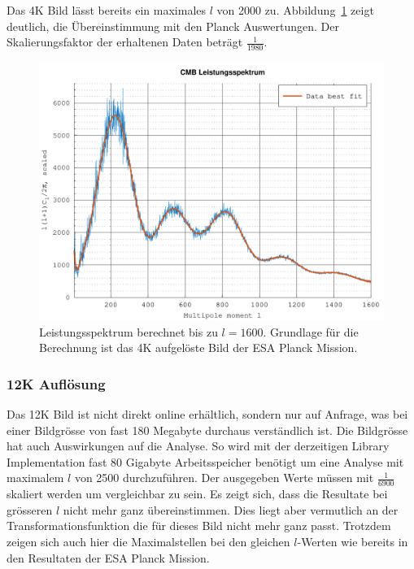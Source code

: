 Das 4K Bild lässt bereits ein maximales $l$ von 2000 zu. 
Abbildung~\ref{fig:cmb-power-spec-1600} zeigt deutlich, die Übereinstimmung mit 
den Planck Auswertungen. Der Skalierungsfaktor der erhaltenen Daten beträgt 
$\frac{1}{1980}$.

\begin{figure}
	\centering
	\includegraphics[width=\linewidth]{cmb/data/4k1800-500.pdf}
	\caption{Leistungsspektrum berechnet bis zu $l = 1600$. Grundlage für die 
		Berechnung ist das 4K aufgelöste Bild der ESA Planck Mission.}
	\label{fig:cmb-power-spec-1600}
\end{figure}

\subsubsection{12K Auflösung}

Das 12K Bild ist nicht direkt online erhältlich, sondern nur auf Anfrage, was 
bei einer Bildgrösse von fast 180 Megabyte durchaus verständlich ist. Die 
Bildgrösse hat auch Auswirkungen auf die Analyse. So wird mit der derzeitigen 
Library Implementation fast 80 Gigabyte Arbeitsspeicher benötigt um eine 
Analyse mit maximalem $l$ von 2500 durchzuführen. Der ausgegeben Werte müssen 
mit $\frac{1}{6900}$ skaliert werden um vergleichbar zu sein. Es zeigt sich, 
dass die Resultate bei grösseren $l$ nicht mehr ganz übereinstimmen. Dies liegt 
aber vermutlich an der Transformationsfunktion die für dieses Bild nicht mehr 
ganz passt. Trotzdem zeigen sich auch hier die Maximalstellen bei den gleichen 
$l$-Werten wie bereits in den Resultaten der ESA Planck Mission.

